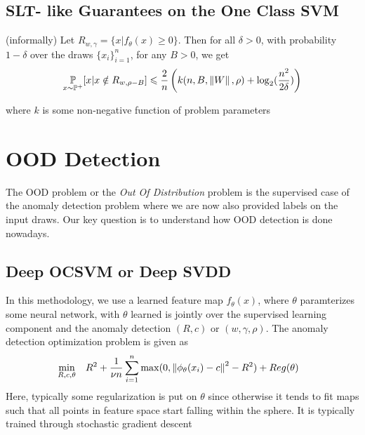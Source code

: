 \documentclass[11pt]{report}
\begin{document}
\subsection{SLT- like Guarantees on the One Class SVM}
\begin{theorem}
    (informally) Let \(R_{w,\gamma}=\{x | f_\theta(x) \geq 0\}\). Then for all \(\delta > 0 \), with probability \(1- \delta\) over the draws \(\{x_i\}_{i=1}^n\), for any \(B >0\), we get
    \begin{align}
        \underset{x \sim \mathbb{P}^+}{\mathbb{P}} [x | x \notin R_{w,\rho-B}] \leqslant \frac{2}{n}\left( k(n,B,\left\lVert W \right\rVert,\rho) + \log_2(\frac{n^2}{2\delta}) \right) \nonumber
    \end{align}
\end{theorem}
where \(k\) is some non-negative function of problem parameters


\section{OOD Detection}
The OOD problem or the \emph{Out Of Distribution} problem is the supervised case of the anomaly detection problem where we are now also provided labels on the input draws. Our key question is to understand how OOD detection is done nowadays.

\subsection{Deep OCSVM or Deep SVDD}
In this methodology, we use a learned feature map \(f_\theta(x)\), where \(\theta\) paramterizes some neural network, with \(\theta\) learned is jointly over the supervised learning component and the anomaly detection \((R,c)\) or \((w,\gamma,\rho)\). The anomaly detection optimization problem is given as 
\begin{align}
    \begin{aligned}
    &\operatorname*{min}_{R,c,\theta}  && R^2+\frac{1}{\nu n}\sum_{i=1}^{n}\max (0,\left\lVert \phi_\theta(x_i)-c \right\rVert^2-R^2) + Reg(\theta)
    \end{aligned}  \nonumber
\end{align}
Here, typically some regularization is put on \(\theta\) since otherwise it tends to fit maps such that all points in feature space  start falling within the sphere. It is typically trained through stochastic gradient descent
\end{document}

